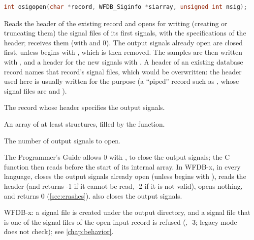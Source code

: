 \begin{lstlisting}[language=C,style=signature]
int osigopen(char *record, WFDB_Siginfo *siarray, unsigned int nsig);
\end{lstlisting}
Reads the header of the existing record  and opens for writing
(creating or truncating them) the signal files of its first 
signals, with the specifications of the header;  receives them
(with  and  0). The output signals already open are
closed first, unless  begins with \code{+}, which is then
removed. The samples are then written with , and a header for
the new signals with . A header of an existing database
record names that record's signal files, which would be overwritten: the
header used here is usually written for the purpose (a ``piped'' record such
as , whose signal files are  and ).
\begin{params}
\item[record] The record whose header specifies the output signals.
\item[siarray] An array of at least  
  structures, filled by the function.
\item[nsig] The number of output signals to open.
\end{params}

The Programmer's Guide allows  0 with  ,
to close the output signals; the C function then reads before the start of
its internal array. In WFDB-x, in every language,  closes the output signals already open (unless  begins with
\code{+}), reads the header (and returns -1 if it cannot be read, -2 if it is
not valid), opens nothing, and returns 0 (\cref{sec:crashes}).  also
closes the output signals.

WFDB-x: a signal file is created under the output directory, and a signal
file that is one of the signal files of the open input record is refused
(, -3; legacy mode does
not check); see \cref{chap:behavior}.

